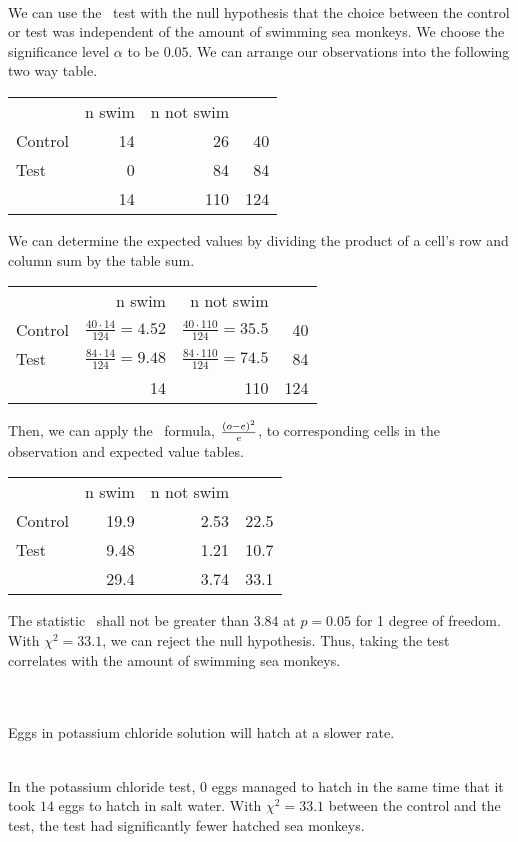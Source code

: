 \documentclass[12pt]{article}
\begin{document}
\\
We can use the \chisq\ test with the null hypothesis that the choice between the control or test was independent of the amount of swimming sea monkeys. We choose the significance level $\alpha$ to be $0.05$. We can arrange our observations into the following two way table.
%
\begin{center}
\begin{tabular}{lrr|r}
& n swim & n not swim & \\
Control & 14 & 26 & 40 \\
Test & 0 & 84 & 84 \\\hline
& 14 & 110 & 124
\end{tabular}
\end{center}
%
We can determine the expected values by dividing the product of a cell's row and column sum by the table sum.
%
\begin{center}
\begin{tabular}{lrr|r}
& n swim & n not swim & \\
Control & $\frac{40\cdot{14}}{124}=4.52$ & $\frac{40\cdot{110}}{124}=35.5$ & 40 \\
Test & $\frac{84\cdot{14}}{124}=9.48$ & $\frac{84\cdot{110}}{124}=74.5$ & 84 \\\hline
& 14 & 110 & 124
\end{tabular}
\end{center}
%
Then, we can apply the \chisq\ formula, $\frac{\left({o-e}\right)^2}{e}$, to corresponding cells in the observation and expected value tables.
%
\begin{center}
\begin{tabular}{lrr|r}
& n swim & n not swim & \\
Control & 19.9 & 2.53 & 22.5 \\
Test & 9.48 & 1.21 & 10.7 \\\hline
& 29.4 & 3.74 & 33.1
\end{tabular}
\end{center}
%
The statistic \chisq\ shall not be greater than $3.84$ at $p=0.05$ for 1 degree of freedom. With $\chi^2=33.1$, we can reject the null hypothesis. Thus, taking the test correlates with the amount of swimming sea monkeys.\double

\\
\\
Eggs in potassium chloride solution will hatch at a slower rate.\double

\\
In the potassium chloride test, $0$ eggs managed to hatch in the same time that it took $14$ eggs to hatch in salt water. With $\chi^2=33.1$ between the control and the test, the test had significantly fewer hatched sea monkeys.\double
\end{document}
